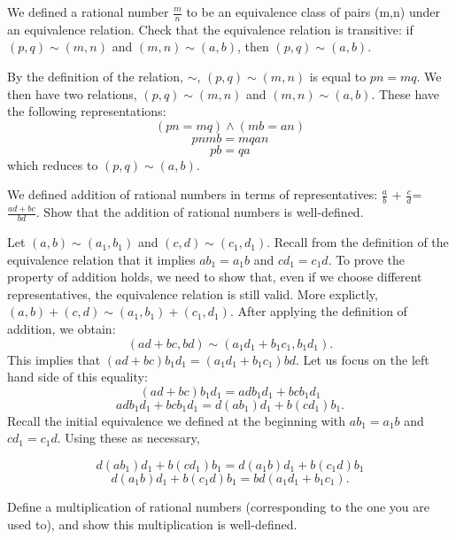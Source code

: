 \documentclass[12pt,letterpaper,boxed]{hmcpset}
\begin{document}

\begin{problem}
We defined a rational number \(\frac{m}{n}\) to be an equivalence class of pairs (m,n) under an equivalence relation. Check that the equivalence relation is transitive: if $(p,q)\sim(m,n)$ and $(m,n)\sim(a,b)$, then $(p,q)\sim(a,b)$. 
\end{problem}


\begin{solution}
By the definition of the relation, $\sim$, $(p,q) \sim (m,n)$ is equal to $pn = mq$.
We then have two relations, $(p,q)\sim(m,n)$ and $(m,n)\sim(a,b)$. These have the following representations:
$$ (pn = mq) \land (mb = an)$$
$$ pnmb = mqan$$
$$pb = qa $$
which reduces to $(p,q)\sim(a,b)$.
\end{solution}

\begin{problem}
We defined addition of rational numbers in terms of representatives: \(\frac{a}{b}\) + \(\frac{c}{d}\)= \(\frac{ad+bc}{bd}\). Show that the addition of rational numbers is well-defined.
\end{problem}

\begin{solution}
Let $(a, b) \sim (a_1, b_1)$ and $(c, d) \sim (c_1, d_1)$. Recall from the definition of the equivalence relation that it implies $ab_1 = a_1b$ and $cd_1 = c_1d$. To prove the property of addition holds, we need to show that, even if we choose different representatives, the equivalence relation is still valid. More explictly, $(a, b) + (c, d) \sim (a_1, b_1) + (c_1, d_1)$. After applying the definition of addition, we obtain:
$$ (ad + bc, bd) \sim (a_1d_1 + b_1c_1, b_1d_1).$$
This implies that $(ad + bc)b_1d_1 = (a_1d_1 + b_1c_1)bd$. Let us focus on the left hand side of this equality:
$$ (ad + bc)b_1d_1 = adb_1d_1 + bcb_1d_1 $$
$$ adb_1d_1 + bcb_1d_1 = d(ab_1)d_1 + b(cd_1)b_1. $$
Recall the initial equivalence we defined at the beginning with $ab_1 = a_1b$ and $cd_1 = c_1d$. Using these as necessary,

$$ d(ab_1)d_1 + b(cd_1)b_1 = d(a_1b)d_1 + b(c_1d)b_1 $$
$$ d(a_1b)d_1 + b(c_1d)b_1 = bd(a_1d_1 + b_1c_1).$$

\end{solution}
\newpage
\begin{problem}
Define a multiplication of rational numbers (corresponding to the one you are used to), and show this multiplication is well-defined.
\end{problem}
\end{document}
